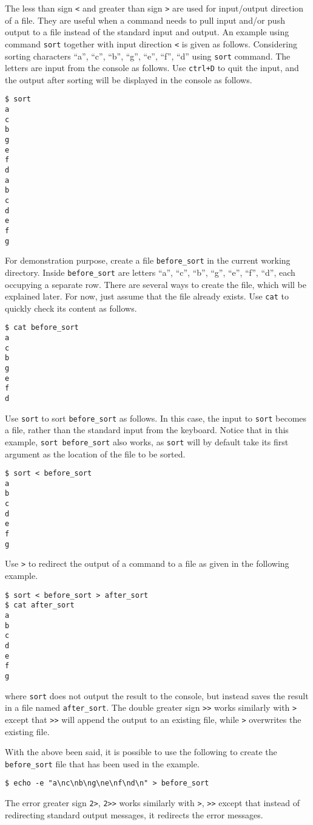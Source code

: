 The less than sign \verb|<| and greater than sign \verb|>| are used for input/output direction of a file. They are useful when a command needs to pull input and/or push output to a file instead of the standard input and output. An example using command \verb|sort| together with input direction \verb|<| is given as follows. Considering sorting characters ``a'', ``c'', ``b'', ``g'', ``e'', ``f'', ``d'' using \verb|sort| command. The letters are input from the console as follows. Use \verb|ctrl+D| to quit the input, and the output after sorting will be displayed in the console as follows.
\begin{lstlisting}
$ sort
a
c
b
g
e
f
d
a
b
c
d
e
f
g
\end{lstlisting}
For demonstration purpose, create a file \verb|before_sort| in the current working directory. Inside \verb|before_sort| are letters ``a'', ``c'', ``b'', ``g'', ``e'', ``f'', ``d'', each occupying a separate row. There are several ways to create the file, which will be explained later. For now, just assume that the file already exists. Use \verb|cat| to quickly check its content as follows.
\begin{lstlisting}
$ cat before_sort
a
c
b
g
e
f
d
\end{lstlisting}

Use \verb|sort| to sort \verb|before_sort| as follows. In this case, the input to \verb|sort| becomes a file, rather than the standard input from the keyboard. Notice that in this example, \verb|sort before_sort| also works, as \verb|sort| will by default take its first argument as the location of the file to be sorted.
\begin{lstlisting}
$ sort < before_sort
a
b
c
d
e
f
g
\end{lstlisting}

Use \verb|>| to redirect the output of a command to a file as given in the following example.
\begin{lstlisting}
$ sort < before_sort > after_sort
$ cat after_sort
a
b
c
d
e
f
g
\end{lstlisting}
where \verb|sort| does not output the result to the console, but instead saves the result in a file named \verb|after_sort|. The double greater sign \verb|>>| works similarly with \verb|>| except that \verb|>>| will append the output to an existing file, while \verb|>| overwrites the existing file.

With the above been said, it is possible to use the following to create the \verb|before_sort| file that has been used in the example.
\begin{lstlisting}
$ echo -e "a\nc\nb\ng\ne\nf\nd\n" > before_sort
\end{lstlisting}

The error greater sign \verb|2>|, \verb|2>>| works similarly with \verb|>|, \verb|>>| except that instead of redirecting standard output messages, it redirects the error messages.




